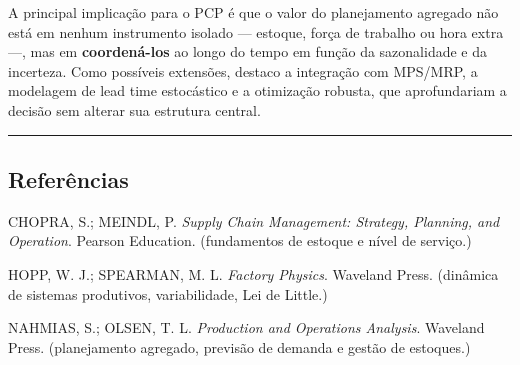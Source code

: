 \documentclass[
  brazilian,
  12pt,
]{article}
\begin{document}
A principal implicação para o PCP é que o valor do planejamento agregado
não está em nenhum instrumento isolado --- estoque, força de trabalho ou
hora extra ---, mas em \textbf{coordená-los} ao longo do tempo em função
da sazonalidade e da incerteza. Como possíveis extensões, destaco a
integração com MPS/MRP, a modelagem de lead time estocástico e a
otimização robusta, que aprofundariam a decisão sem alterar sua
estrutura central.

\begin{center}\rule{0.5\linewidth}{0.5pt}\end{center}

\subsection{Referências}\label{referuxeancias}

CHOPRA, S.; MEINDL, P. \emph{Supply Chain Management: Strategy,
Planning, and Operation}. Pearson Education. (fundamentos de estoque e
nível de serviço.)

HOPP, W. J.; SPEARMAN, M. L. \emph{Factory Physics}. Waveland Press.
(dinâmica de sistemas produtivos, variabilidade, Lei de Little.)

NAHMIAS, S.; OLSEN, T. L. \emph{Production and Operations Analysis}.
Waveland Press. (planejamento agregado, previsão de demanda e gestão de
estoques.)
\end{document}
